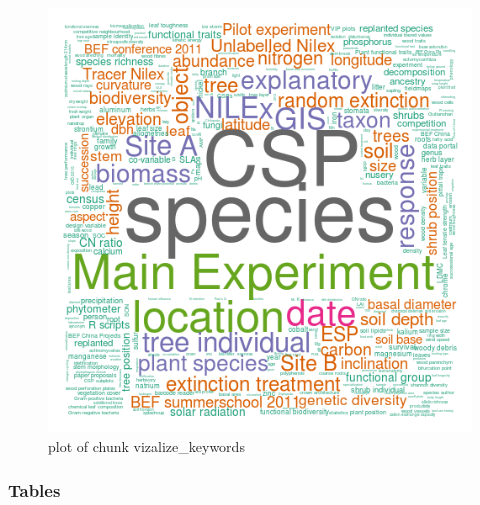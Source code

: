 \documentclass[]{article}
\makeatletter
\def\maxwidth{\ifdim\Gin@nat@width>\linewidth\linewidth
\else\Gin@nat@width\fi}
\let\Oldincludegraphics\includegraphics
\renewcommand{\includegraphics}[1]{\Oldincludegraphics[width=\maxwidth]{#1}}
\makeatother
\begin{document}
\begin{figure}[htbp]
\centering
\includegraphics{figure/vizalize_keywords.png}
\caption{plot of chunk vizalize\_keywords}
\end{figure}

\subsubsection{Tables}
\end{document}
